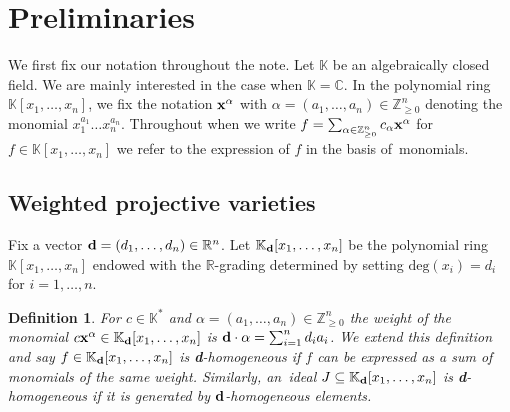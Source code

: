 \documentclass[pdftex]{sigma}%
\newtheorem{Definition}[Theorem]{Definition}
\numberwithin{equation}{section}
\begin{document}
\section{Preliminaries}\label{sec:prep}
We first fix our notation throughout the note. Let $\mathbb{K}$ be an algebraically closed field. We are mainly interested in the case when $\mathbb{K}= \mathbb{C}$. In the polynomial ring $\mathbb K[x_1, \dots , x_n]$, we fix the notation ${\bf x}^\alpha$ with $\alpha=(a_1,\ldots,a_n)\in \mathbb Z_{\ge 0}^n$ denoting the monomial $x_1^{a_1}\dots x_n^{a_n}$.
Throughout when we write $f = \sum_{\alpha\in \mathbb{Z}^n_{\geq 0}} c_{\alpha} {\bf x}^{\alpha}$ for $f \in \mathbb K[x_1, \dots , x_n]$ we refer to the expression of $f$ in the basis of~monomials.

\subsection{Weighted projective varieties}
Fix a vector $ {\bf d}=(d_1, \dots , d_n)\in \mathbb R^n$.
Let $\mathbb K_{\bf d}[x_1, \dots , x_n]$ be the polynomial ring $\mathbb K [x_1, \dots , x_n]$ endowed with the $\mathbb R$-grading determined by setting $\text{deg} (x_i)=d_i$ for $i = 1, \dots , n$.

\begin{Definition}
For $c \in \mathbb K^{\ast}$ and $ \alpha=(a_1,\dots , a_n) \in \mathbb Z_{\geq 0}^n$ the {\it weight} of the monomial $ c {\bf x}^{\alpha}\in \mathbb K_{\bf d}[x_1, \dots , x_n]$ is ${\bf d}\cdot \alpha = \sum_{i=1}^nd_ia_i$.
We extend this definition and say $f \in \mathbb K_{\bf d}[x_1, \dots , x_n]$ is {\bf d}-{\it homogeneous} if $f$ can be expressed as a sum of monomials of the same weight.
Similarly, an~ideal $J\subseteq \mathbb K_{\bf d}[x_1, \dots , x_n]$ is {\bf d}-{\it homogeneous} if it is generated by ${\bf d}$-homogeneous elements.
\end{Definition}
\end{document}
